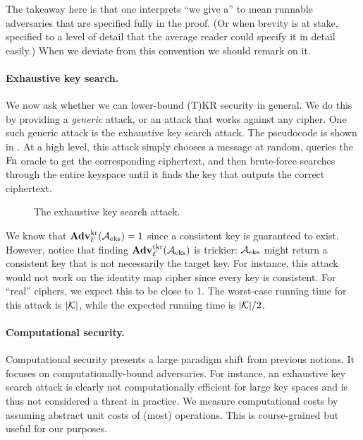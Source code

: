 The takeaway here is that one interprets ``we give a'' to mean runnable
adversaries that are specified fully in the proof. (Or when brevity is at stake,
specified to a level of detail that the average reader could specify it in
detail easily.)  When we deviate from this convention we should remark on it.



\paragraph{Exhaustive key search.} We now ask whether we can lower-bound (T)KR security in general. We do this by providing a \textit{generic} attack, or an attack that works against any cipher. One such generic attack is the exhaustive key search attack. The pseudocode is shown in . At a high level, this attack simply chooses a message at random, queries the $\textnormal{Fn}$ oracle to get the corresponding ciphertext, and then brute-force searches through the entire keyspace until it finds the key that outputs the correct ciphertext.  

\begin{wrapfigure}[7]{l}{0pt}
	\caption{The exhaustive key search attack.}
	\label{fig:eks}
\end{wrapfigure} 

We know that $\mathbf{Adv}^{\mathrm{kr}}_{{\cal E}}({\mathcal A}_{\textnormal{eks}}) = 1$ since a consistent key is guaranteed to exist. However, notice that finding $\mathbf{Adv}^{\mathrm{tkr}}_{{\cal E}}({\mathcal A}_{\textnormal{eks}})$ is trickier: ${\mathcal A}_{\textnormal{eks}}$ might return a consistent key that is not necessarily the target key. For instance, this attack would not work on the identity map cipher since every key is consistent. For ``real'' ciphers, we expect this to be close to 1. 
The worst-case running time for this attack is $|{\cal K}|$, while the expected running time is $|{\cal K}|/2$.

\paragraph{Computational security.} Computational security presents a large paradigm shift from previous notions. It focuses on computationally-bound adversaries. For instance, an exhaustive key search attack is clearly not computationally efficient for large key spaces and is thus not considered a threat in practice. We measure computational costs by assuming abstract unit costs of (most) operations. This is course-grained but useful for our purposes. 

